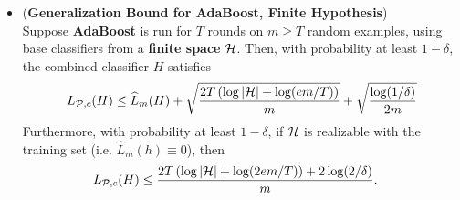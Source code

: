 \documentclass[11pt]{article}
\begin{document}
\begin{itemize}
\item \begin{theorem}  (\textbf{Generalization Bound for AdaBoost, Finite Hypothesis}) \citep{schapire2012boosting}\\
Suppose \textbf{AdaBoost} is run for $T$ rounds on $m \ge T$ random examples, using base classifiers from a \textbf{finite space} ${\mathcal H}$. Then, with probability at least $1 - \delta$, the combined classifier $H$ satisfies
\begin{align}
L_{{\mathcal P}, c}(H) \le \widehat{L}_{m}(H) + \sqrt{\frac{2 T\left( \log \left\lvert {\mathcal H} \right\rvert + \log(em/T) \right)}{m}} +\sqrt{\frac{\log(1/\delta)}{2m}} \label{eqn: generalization_bound_growth_number_adaboost_finite}
\end{align} Furthermore, with probability at least $1 - \delta$, if ${\mathcal H}$ is realizable with the training set (i.e. $\widehat{L}_{m}(h) \equiv 0$), then
\begin{align}
L_{{\mathcal P}, c}(H) &\le \frac{2 T\left( \log \left\lvert {\mathcal H} \right\rvert + \log(2em/T) \right) + 2\log(2/\delta)}{m}. \label{eqn: pac_sample_complexity_finite_case_consistency}
\end{align}
\end{theorem}
\end{itemize}
\end{document}
